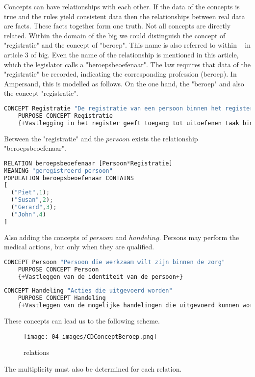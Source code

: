 Concepts can have relationships with each other.
If the data of the concepts is true and the rules yield consistent data then the relationships between real data are facts.
These facts together form one truth.
Not all concepts are directly related.
Within the domain of the \acrshort{big} we could distinguish the concept of "registratie" and the concept of "beroep".
This name is also referred to within ~ in article 3 of \acrshort{big}.
Even the name of the relationship is mentioned in this article, which the legislator calls a "beroepsbeoefenaar".
The law requires that data of the "registratie" be recorded, indicating the corresponding profession (beroep).
In Ampersand, this is modelled as follows.
On the one hand, the "beroep" and also the concept "registratie".
\begin{lstlisting}[language=Octave] 
    CONCEPT Registratie "De registratie van een persoon binnen het register" 
    PURPOSE CONCEPT Registratie 
    {+Vastlegging in het register geeft toegang tot uitoefenen taak binnen de gezondheidszorg+}
\end{lstlisting}
Between the "registratie" and the $persoon$ exists the relationship "beroepsbeoefenaar".
\begin{lstlisting}[language=Octave] 
RELATION beroepsbeoefenaar [Persoon*Registratie] 
MEANING "geregistreerd persoon"
POPULATION beroepsbeoefenaar CONTAINS 
[
  ("Piet",1);
  ("Susan",2);
  ("Gerard",3);
  ("John",4)
]\end{lstlisting}
Also adding the concepts of $persoon$ and $handeling$.
Persons may perform the medical actions, but only when they are qualified.
\begin{lstlisting}[language=Octave] 
    CONCEPT Persoon "Persoon die werkzaam wilt zijn binnen de zorg"
    PURPOSE CONCEPT Persoon 
    {+Vastleggen van de identiteit van de persoon+}
\end{lstlisting}
\begin{lstlisting}[language=Octave] 
    CONCEPT Handeling "Acties die uitgevoerd worden" 
    PURPOSE CONCEPT Handeling 
    {+Vastleggen van de mogelijke handelingen die uitgevoerd kunnen worden binnen de zorg+}
\end{lstlisting}
These concepts can lead us to the following scheme.
\begin{figure}[H] 
\texttt{[image: 04\_images/CDConceptBeroep.png]}
\centering
\caption{relations}
\label{fig:relations}
\end{figure}
The multiplicity must also be determined for each relation.
